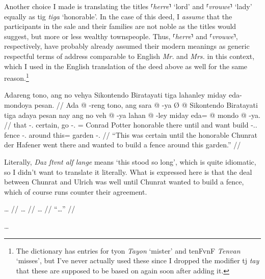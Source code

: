 \documentclass[12pt,paper=a4]{scrartcl}
\newcommand{\fw}[1]{\textit{#1}} %
\newcommand{\norm}[1]{⸢\textit{#1}⸣} %
\newcommand{\ayr}[1]{{\Tagati #1}}
\newcommand{\xayr}[3]{{\Tagati #1} \emph{#2} \enquote*{#3}}
\begin{document}
Another choice I made is translating the titles \norm{herre} `lord' and 
\norm{vrouwe} `lady' equally as \xayr{tig}{tiga} {honorable}. In the case of 
this deed, I \emph{assume} that the participants in the sale and their families 
are not noble as the titles would suggest, but more or less wealthy townspeople. 
Thus, \norm{herre} and \norm{vrouwe}, respectively, have probably already 
assumed their modern meanings as generic respectful terms of address comparable 
to English \fw{Mr.} and \fw{Mrs.} in this context, which I used in the English 
translation of the deed above as well for the same reason.\footnote{The 
dictionary has entries for \xayr{tyon}{Tayon}{mister} and 
\xayr{tenFvnF}{Tenvan}{misses}, but I've never actually used these since I 
dropped the modifier \ayr{tj} \fw{tay} that these are supposed to be based on 
again soon after adding it.}


\ex \begingl
	\glpreamble Adareng tono, ang no vehya Sikontendo Biratayati tiga
		lahanley miday eda-mondoya pesan. //
	\gla Ada @ -reng tono, ang sara @ -ya Ø @ Sikontendo Biratayati tiga
		adaya pesan nay ang no veh @ -ya lahan @ -ley miday eda= @ mondo 
		@ -ya. //
	\glb that -\Aarg{}.\Inan{} certain, \AgtT{} go -\Tsg{}.\M{} \Top{}= 
		Conrad Potter honorable there until and \AgtT{} want build 
		-\Tsg{}.\M{}.\Top{} fence -\Parg{}.\Inan{} around this= garden 
		-\Loc{}. //
	\glft \enquote{This was certain until the honorable Chunrat der Hafener 
		went there and wanted to build a fence around this garden.} //
\endgl \xe

Literally, \fw{Daz ſtvnt alſ lange} means `this stood so long', which is 
quite idiomatic, so I didn't want to translate it literally. What is expressed 
here is that the deal between Chunrat and Ulrich was well until Chunrat wanted 
to build a fence, which of course runs counter their agreement.


\ex \begingl
	\glpreamble … //
	\gla … //
	\glb … //
	\glft \enquote{…} //
\endgl \xe

…

\end{document}
